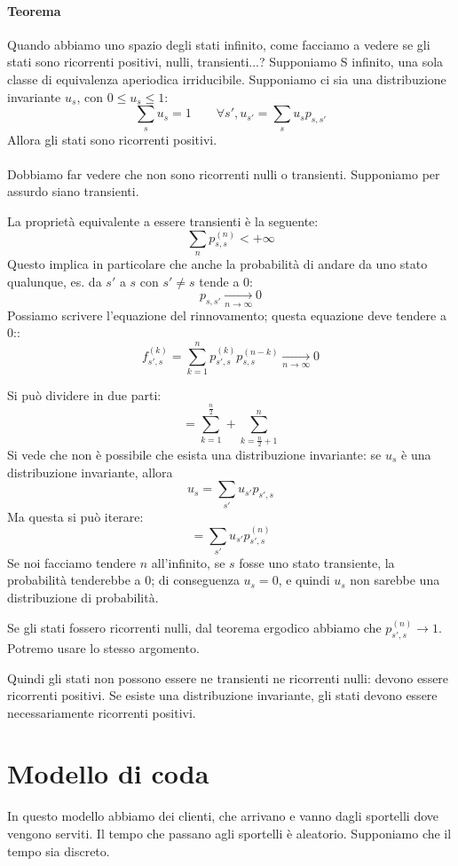 \documentclass[a4paper,12pt]{book}
\begin{document}
\paragraph{Teorema} Quando abbiamo uno spazio degli stati infinito, come facciamo a vedere se gli stati sono ricorrenti positivi, nulli, transienti...? Supponiamo S infinito, una sola classe di equivalenza aperiodica irriducibile. Supponiamo ci sia una distribuzione invariante $ u_s $, con $ 0 \le u_s \le 1 $:
$$ \sum_{s}u_s = 1 \qquad \forall s', u_{s'} = \sum_{s} u_s p_{s,s'} $$
Allora gli stati sono ricorrenti positivi. 
\\
\\
Dobbiamo far vedere che non sono ricorrenti nulli o transienti. Supponiamo per assurdo siano transienti.

La proprietà equivalente a essere transienti è la seguente:
$$ \sum_n p^{(n)}_{s,s} < + \infty $$ 
Questo implica in particolare che anche la probabilità di andare da uno stato qualunque, es. da $ s' $ a $ s $ con $ s' \ne s $ tende a 0:
$$ p_{s,s'} \underset{n\to \infty}{\longrightarrow} 0  $$
Possiamo scrivere l'equazione del rinnovamento; questa equazione deve tendere a 0::
$$ f_{s',s}^{(k)}  = \sum_{k=1}^{n} p^{(k)}_{s',s} p^{(n-k)}_{s,s} \underset{n \to \infty}{\longrightarrow} 0$$

Si può dividere in due parti:
$$ = \sum_{k=1}^{\frac{n}{2}} + \sum_{k=\frac{n}{2} + 1}^{n}$$
Si vede che non è possibile che esista una distribuzione invariante: se $ u_s $ è una distribuzione invariante, allora
$$ u_s = \sum_{s'}u_{s'} p_{s',s} $$
Ma questa si può iterare:
$$ = \sum_{s'}u_{s'} p^{(n)}_{s',s} $$
Se noi facciamo tendere $ n $ all'infinito, se $ s $ fosse uno stato transiente, la probabilità tenderebbe a 0; di conseguenza $ u_s = 0 $, e quindi $ u_s $ non sarebbe una distribuzione di probabilità.

Se gli stati fossero ricorrenti nulli, dal teorema ergodico abbiamo che $ p^{(n)}_{s',s} \to 1 $. Potremo usare lo stesso argomento. 

Quindi gli stati non possono essere ne transienti ne ricorrenti nulli: devono essere ricorrenti positivi. Se esiste una distribuzione invariante, gli stati devono essere necessariamente ricorrenti positivi.

\section{Modello di coda}
In questo modello abbiamo dei clienti, che arrivano e vanno dagli sportelli dove vengono serviti. Il tempo che passano agli sportelli è aleatorio. Supponiamo che il tempo sia discreto. 
\end{document}

